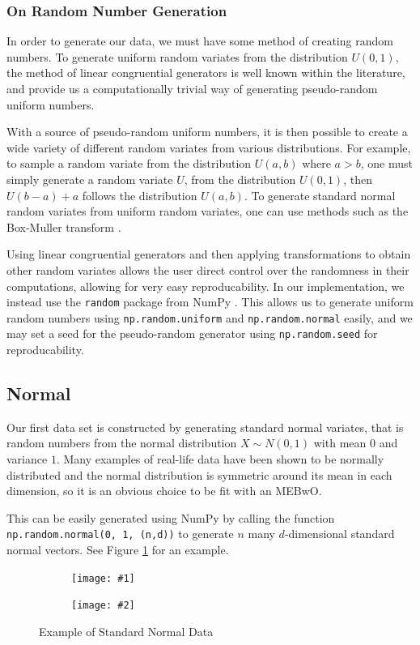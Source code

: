 \documentclass[11pt,twoside]{report}
\newcommand{\datafigure}[4]{
    \begin{figure}
    \centering
    \begin{subfigure}[b]{0.3333\textwidth}
        \centering
        \texttt{[image: \#1]}
    \end{subfigure}
    \begin{subfigure}[b]{0.3333\textwidth}
        \centering
        \texttt{[image: \#2]}
    \end{subfigure}
    \hfill
    \caption{#3}
    \label{#4}
\end{figure}
}
\theoremstyle{definition}
\numberwithin{theorem}{section}
\numberwithin{definition}{section}
\numberwithin{lemma}{section}
\numberwithin{proposition}{section}
\numberwithin{equation}{section}
\numberwithin{figure}{section}
\begin{document}
\subsubsection{On Random Number Generation}
In order to generate our data, we must have some method of creating random numbers. To generate uniform random variates from the distribution $U(0,1)$, the method of linear congruential generators \cite{lcg1,lcg2} is well known within the literature, and provide us a computationally trivial way of generating pseudo-random uniform numbers.

With a source of pseudo-random uniform numbers, it is then possible to create a wide variety of different random variates from various distributions. For example, to sample a random variate from the distribution $U(a,b)$ where $a>b$, one must simply generate a random variate $U$, from the distribution $U(0,1)$, then $U(b-a)+a$ follows the distribution $U(a,b)$. To generate standard normal random variates from uniform random variates, one can use methods such as the Box-Muller transform \cite{boxmuller}.

Using linear congruential generators and then applying transformations to obtain other random variates allows the user direct control over the randomness in their computations, allowing for very easy reproducability. In our implementation, we instead use the \texttt{random} package from NumPy \cite{numpy}. This allows us to generate uniform random numbers using \texttt{np.random.uniform} and \texttt{np.random.normal} easily, and we may set a seed for the pseudo-random generator using \texttt{np.random.seed} for reproducability.


\subsection{Normal}
Our first data set is constructed by generating standard normal variates, that is random numbers from the normal distribution $X\sim N(0,1)$ with mean $0$ and variance $1$. Many examples of real-life data have been shown to be normally distributed and the normal distribution is symmetric around its mean in each dimension, so it is an obvious choice to be fit with an MEBwO.

This can be easily generated using NumPy \cite{numpy} by calling the function \texttt{np.random.normal(0, 1, (n,d))} to generate $n$ many $d$-dimensional standard normal vectors. See Figure \ref{fig:normal} for an example.

\datafigure{normal_2d.png}{normal_3d.png}{Example of Standard Normal Data}{fig:normal}
\end{document}
